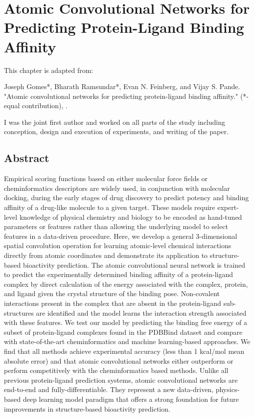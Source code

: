 \section{Atomic Convolutional Networks for Predicting Protein-Ligand Binding Affinity}

This chapter is adapted from: 

Joseph Gomes*, Bharath Ramsundar*, Evan N. Feinberg, and Vijay S. Pande. "Atomic convolutional networks for predicting protein-ligand binding affinity." (*-equal contribution), \cite{gomes2017atomic}. 


I was the joint first author and worked on all parts of the study including conception, design and execution of experiments, and writing of the paper.


\subsection{Abstract}
Empirical scoring functions based on either molecular force fields or cheminformatics descriptors are widely used, in conjunction with molecular docking, during the early stages of drug discovery to predict potency and binding affinity of a drug-like molecule to a given target.  These models require expert-level knowledge of physical chemistry and biology to be encoded as hand-tuned parameters or features rather than allowing the underlying model to select features in a data-driven procedure.  Here, we develop a general 3-dimensional spatial convolution operation for learning atomic-level chemical interactions directly from atomic coordinates and demonstrate its application to structure-based bioactivity prediction.  The atomic convolutional neural network is trained to predict the experimentally determined binding affinity of a protein-ligand complex by direct calculation of the energy associated with the complex, protein, and ligand given the crystal structure of the binding pose. Non-covalent interactions present in the complex that are absent in the protein-ligand sub-structures are identified and the model learns the interaction strength associated with these features. We test our model by predicting the binding free energy of a subset of protein-ligand complexes found in the PDBBind dataset and compare with state-of-the-art cheminformatics and machine learning-based approaches.  We find that all methods achieve experimental accuracy (less than 1 kcal/mol mean absolute error) and that atomic convolutional networks either outperform or perform competitively with the cheminformatics based methods. Unlike all previous protein-ligand prediction systems, atomic convolutional networks are end-to-end and fully-differentiable.  They represent a new data-driven, physics-based deep learning model paradigm that offers a strong foundation for future improvements in structure-based bioactivity prediction. 


